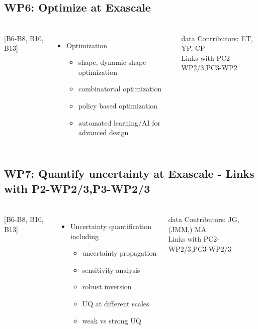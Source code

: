 \subsection{WP6: Optimize at Exascale }
\begin{frame}
  \frametitle{\insertsectionhead}
  \framesubtitle{\insertsubsectionhead}
  \begin{columns}
    [B6-B8, B10, B13]
    \begin{itemize}
      \item Optimization 
      \begin{itemize}
        \item shape, dynamic shape optimization
        \item combinatorial optimization
        \item policy based optimization
        \item automated learning/AI for advanced design
      \end{itemize}
    \end{itemize}
    \begin{alertblock}{data}
      Contributors: ET, YP, CP\\
      Links with PC2-WP2/3,PC3-WP2 
    \end{alertblock}
  \end{columns}
\end{frame}

\subsection{WP7: Quantify uncertainty at Exascale - Links with P2-WP2/3,P3-WP2/3 }
\begin{frame}
  \frametitle{\insertsectionhead}
  \framesubtitle{\insertsubsectionhead}
  \begin{columns}
    [B6-B8, B10, B13]
    \begin{itemize}
      \item Uncertainty quantification including 
      \begin{itemize}
        \item uncertainty propagation
        \item sensitivity analysis
        \item robust inversion
        \item UQ at different scales
        \item weak vs strong UQ
      \end{itemize}
    \end{itemize}
    \begin{alertblock}{data}
      Contributors: JG, (JMM,) MA\\
      Links with PC2-WP2/3,PC3-WP2/3
    \end{alertblock}
  \end{columns}
\end{frame}

